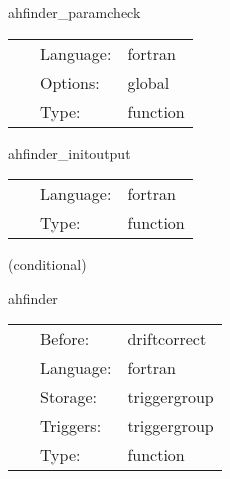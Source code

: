\vspace{5mm}


\hspace{5mm} ahfinder\_paramcheck 

\hspace{5mm}{\it check for physical or conformal metric } 


\hspace{5mm}

 \begin{tabular*}{160mm}{cll} 
~ & Language:  & fortran \\ 
~ & Options:  & global \\ 
~ & Type:  & function \\ 
\end{tabular*} 


\vspace{5mm}


\hspace{5mm} ahfinder\_initoutput 

\hspace{5mm}{\it create output files, write headers } 


\hspace{5mm}

 \begin{tabular*}{160mm}{cll} 
~ & Language:  & fortran \\ 
~ & Type:  & function \\ 
\end{tabular*} 


\vspace{5mm}

   (conditional) 

\hspace{5mm} ahfinder 

\hspace{5mm}{\it call apparent horizon finder with persisting grid functions } 


\hspace{5mm}

 \begin{tabular*}{160mm}{cll} 
~ & Before:  & driftcorrect \\ 
~ & Language:  & fortran \\ 
~ & Storage:  & triggergroup \\ 
~ & Triggers:  & triggergroup \\ 
~ & Type:  & function \\ 
\end{tabular*} 


